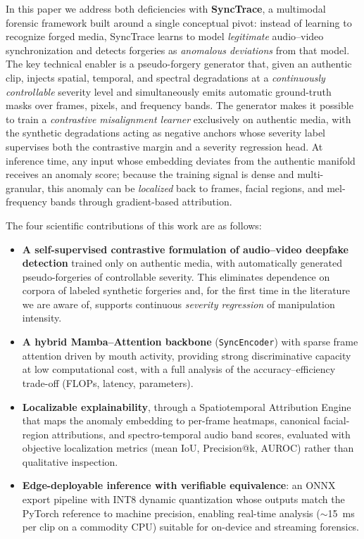 \documentclass[sn-basic,Numbered,referee]{sn-jnl}
\begin{document}
In this paper we address both deficiencies with \textbf{SyncTrace}, a multimodal forensic framework built around a single conceptual pivot: instead of learning to recognize forged media, SyncTrace learns to model \emph{legitimate} audio--video synchronization and detects forgeries as \emph{anomalous deviations} from that model. The key technical enabler is a pseudo-forgery generator that, given an authentic clip, injects spatial, temporal, and spectral degradations at a \emph{continuously controllable} severity level and simultaneously emits automatic ground-truth masks over frames, pixels, and frequency bands. The generator makes it possible to train a \emph{contrastive misalignment learner} exclusively on authentic media, with the synthetic degradations acting as negative anchors whose severity label supervises both the contrastive margin and a severity regression head. At inference time, any input whose embedding deviates from the authentic manifold receives an anomaly score; because the training signal is dense and multi-granular, this anomaly can be \emph{localized} back to frames, facial regions, and mel-frequency bands through gradient-based attribution.

The four scientific contributions of this work are as follows:
\begin{itemize}
  \item \textbf{A self-supervised contrastive formulation of audio--video deepfake detection} trained only on authentic media, with automatically generated pseudo-forgeries of controllable severity. This eliminates dependence on corpora of labeled synthetic forgeries and, for the first time in the literature we are aware of, supports continuous \emph{severity regression} of manipulation intensity.
  \item \textbf{A hybrid Mamba--Attention backbone} (\texttt{SyncEncoder}) with sparse frame attention driven by mouth activity, providing strong discriminative capacity at low computational cost, with a full analysis of the accuracy--efficiency trade-off (FLOPs, latency, parameters).
  \item \textbf{Localizable explainability}, through a Spatiotemporal Attribution Engine that maps the anomaly embedding to per-frame heatmaps, canonical facial-region attributions, and spectro-temporal audio band scores, evaluated with objective localization metrics (mean IoU, Precision@k, AUROC) rather than qualitative inspection.
  \item \textbf{Edge-deployable inference with verifiable equivalence}: an ONNX export pipeline with INT8 dynamic quantization whose outputs match the PyTorch reference to machine precision, enabling real-time analysis ($\sim$15~ms per clip on a commodity CPU) suitable for on-device and streaming forensics.
\end{itemize}
\end{document}
